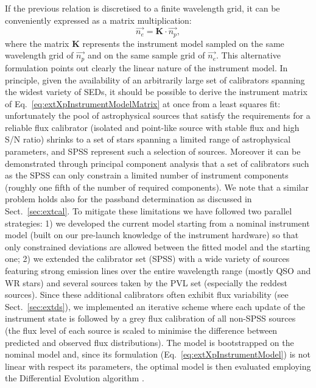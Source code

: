 \documentclass{aa}
\newcommand{\secname}{Sect.}
\newcommand{\equref}[1]{Eq.~\ref{eq:#1}}
\newcommand{\secref}[1]{\secname~\ref{sec:#1}}
\begin{document}
\begin{appendix}
If the previous relation is discretised to a finite wavelength grid, it can be conveniently expressed as a matrix multiplication:
\begin{equation}
\label{eq:extXpInstrumentModelMatrix}
\overrightarrow{n_e} = \mathbf{K} \cdot \overrightarrow{n_p},
\end{equation}
where the matrix $\mathbf{K}$ represents the instrument model sampled on the same wavelength grid of $\overrightarrow{n_p}$ and on the same  sample grid of $\overrightarrow{n_e}$. This alternative formulation points out clearly the linear nature of the instrument model.
In principle, given the availability of an arbitrarily large set of calibrators spanning the widest variety of SEDs, it should be possible to derive the instrument matrix of \equref{extXpInstrumentModelMatrix} at once from a least squares fit: unfortunately the pool of astrophysical sources that satisfy the requirements for a reliable flux calibrator (isolated and point-like source with stable flux and high S/N ratio) shrinks to a set of stars spanning a limited range of astrophysical parameters, and SPSS represent such a selection of sources. Moreover it can be demonstrated through principal component analysis that a set of calibrators such as the SPSS can only constrain a limited number of instrument components (roughly one fifth of the number of required components). We note that a similar problem holds also for the passband determination as discussed in \secref{extcal}. To mitigate these limitations we have followed two parallel strategies:
1) we developed the current model starting from a nominal instrument model (built on our pre-launch knowledge of the instrument hardware) so that only constrained deviations are allowed between the fitted model and the starting one; 
2) we extended the calibrator set (SPSS) with a wide variety of sources featuring strong emission lines over the entire wavelength range (mostly QSO and WR stars) and several sources taken by the PVL set (especially the reddest sources). 
Since these additional calibrators often exhibit flux variability (see \secref{extds}), we implemented an iterative scheme where each update of the instrument state is followed by a grey flux calibration of all non-SPSS sources (the flux level of each source is scaled to minimise the difference between predicted and observed flux distributions). The model is bootstrapped on the nominal model and, since its formulation (\equref{extXpInstrumentModel}) is not linear with respect its parameters, the optimal model is then evaluated employing the Differential Evolution algorithm \citep{storn}.


\end{appendix}
\end{document}
